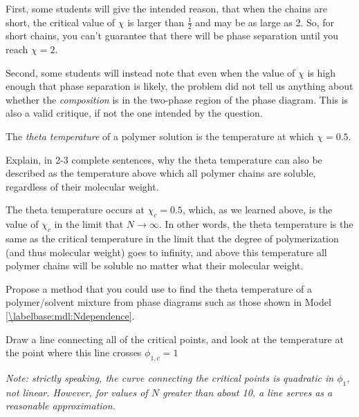 \begin{activity}
\begin{ctqs}
\begin{solution}[2.5in]
			First, some students will give the intended reason, that when the chains are short, the critical value of $\chi$ is larger than $\frac{1}{2}$ and may be as large as 2.  So, for short chains, you can't guarantee that there will be phase separation until you reach $\chi = 2$.
			
			Second, some students will instead note that even when the value of $\chi$ is high enough that phase separation is likely, the problem did not tell us anything about whether the \emph{composition} is in the two-phase region of the phase diagram.  This is also a valid critique, if not the one intended by the question.
		\end{solution}

\end{ctqs}


\begin{infobox}
	
	The \emph{theta temperature} of a polymer solution is the temperature at which $\chi=0.5$.
	
\end{infobox}


\begin{ctqs}

	\question Explain, in 2-3 complete sentences, why the theta temperature can also be described as the temperature above which all polymer chains are soluble, regardless of their molecular weight.
	
		\begin{solution}[2in]
			The theta temperature occurs at $\chi_c =0.5$, which, as we learned above, is the value of $\chi_c$ in the limit that $N\to\infty$.  In other words, the theta temperature is the same as the critical temperature in the limit that the degree of polymerization (and thus molecular weight) goes to infinity, and above this temperature all polymer chains will be soluble no matter what their molecular weight.
		\end{solution}
	
	\question Propose a method that you could use to find the theta temperature of a polymer/solvent mixture from phase diagrams such as those shown in Model \ref{\labelbase:mdl:Ndependence}.
	
		\begin{solution}[1.25in]
			Draw a line connecting all of the critical points, and look at the temperature at the point where this line crosses $\phi_{1,c} =1$
			
			\emph{Note: strictly speaking, the curve connecting the critical points is quadratic in $\phi_1$, not linear.  However, for values of $N$ greater than about 10, a line serves as a reasonable approximation.}
		\end{solution} 


\end{ctqs}
\end{activity}
